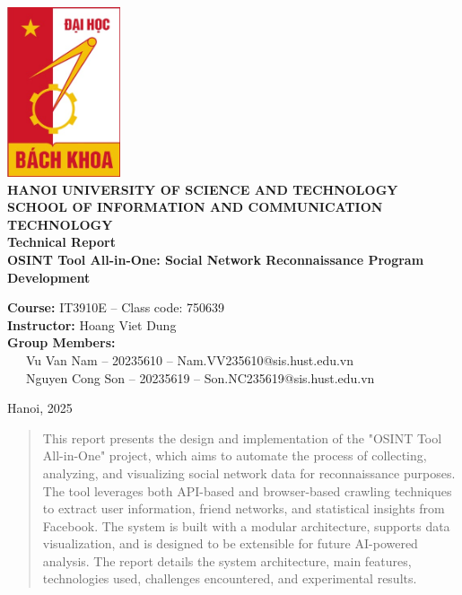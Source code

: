 \documentclass[13pt,a4paper]{report}
\begin{document}
\begin{titlepage}
    \centering
    \includegraphics[width=0.25\textwidth]{hust_logo.jpg} \\[1.5cm]
    {\Large \textbf{HANOI UNIVERSITY OF SCIENCE AND TECHNOLOGY}} \\[0.5cm]
    {\large \textbf{SCHOOL OF INFORMATION AND COMMUNICATION TECHNOLOGY}} \\[1.5cm]
    {\Huge \textbf{Technical Report}} \\[0.5cm]
    {\LARGE \textbf{OSINT Tool All-in-One: Social Network Reconnaissance Program Development}} \\[1.5cm]
    \begin{flushleft}
        {\large \textbf{Course:} IT3910E -- Class code: 750639} \\[0.75cm]
        {\large \textbf{Instructor:} Hoang Viet Dung} \\[0.75cm]
        {\large \textbf{Group Members:}} \\ [0.5cm]
        {\large \ \ \ Vu Van Nam -- 20235610 -- Nam.VV235610@sis.hust.edu.vn} \\[0.5cm]
        {\large \ \ \ Nguyen Cong Son -- 20235619 -- Son.NC235619@sis.hust.edu.vn} \\[0.5cm]
    \end{flushleft}
    \vfill
    Hanoi, 2025
\end{titlepage}

\begin{abstract}
This report presents the design and implementation of the "OSINT Tool All-in-One" project, which aims to automate the process of collecting, analyzing, and visualizing social network data for reconnaissance purposes. The tool leverages both API-based and browser-based crawling techniques to extract user information, friend networks, and statistical insights from Facebook. The system is built with a modular architecture, supports data visualization, and is designed to be extensible for future AI-powered analysis. The report details the system architecture, main features, technologies used, challenges encountered, and experimental results.
\end{abstract}
\end{document}
